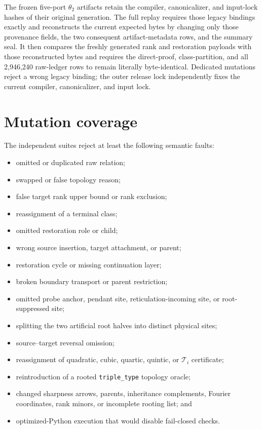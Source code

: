 \documentclass[11pt]{article}
\theoremstyle{remark}
\newcommand{\Ti}{\mathcal T_i}
\begin{document}
The frozen five-port \(\theta_2\) artifacts retain the compiler,
canonicalizer, and input-lock hashes of their original generation.  The full
replay requires those legacy bindings exactly and reconstructs the current
expected bytes by changing only those provenance fields, the two consequent
artifact-metadata rows, and the summary seal.  It then compares the freshly
generated rank and restoration payloads with those reconstructed bytes and
requires the direct-proof, class-partition, and all 2,946,240 raw-ledger rows
to remain literally byte-identical.  Dedicated mutations reject a wrong
legacy binding; the outer release lock independently fixes the current
compiler, canonicalizer, and input lock.

\section{Mutation coverage}\label{sec:mutations}

The independent suites reject at least the following semantic faults:
\begin{itemize}
  \item omitted or duplicated raw relation;
  \item swapped or false topology reason;
  \item false target rank upper bound or rank exclusion;
  \item reassignment of a terminal class;
  \item omitted restoration role or child;
  \item wrong source insertion, target attachment, or parent;
  \item restoration cycle or missing continuation layer;
  \item broken boundary transport or parent restriction;
  \item omitted probe anchor, pendant site, reticulation-incoming site, or
        root-suppressed site;
  \item splitting the two artificial root halves into distinct physical sites;
  \item source--target reversal omission;
  \item reassignment of quadratic, cubic, quartic, quintic, or \(\Ti\)
        certificate;
  \item reintroduction of a rooted \texttt{triple\_type} topology oracle;
  \item changed sharpness arrows, parents, inheritance complements, Fourier
        coordinates, rank minors, or incomplete rooting list; and
  \item optimized-Python execution that would disable fail-closed checks.
\end{itemize}
\end{document}
